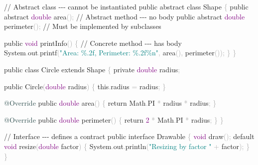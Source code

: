 \documentclass[
  justified,
  openright,
]{tufte-book}
\newcommand{\AttributeTok}[1]{\textcolor{DarkSlateGray}{#1}}
\newcommand{\BuiltInTok}[1]{#1}
\newcommand{\CommentTok}[1]{\textcolor{MidGray}{#1}}
\newcommand{\ControlFlowTok}[1]{\textcolor{BrandBlue}{#1}}
\newcommand{\DataTypeTok}[1]{\textcolor{Purple}{#1}}
\newcommand{\DecValTok}[1]{\textcolor{Purple}{#1}}
\newcommand{\FunctionTok}[1]{\textcolor{BrandBlue}{#1}}
\newcommand{\KeywordTok}[1]{\textcolor{BrandBlue}{#1}}
\newcommand{\NormalTok}[1]{#1}
\newcommand{\OperatorTok}[1]{\textcolor{DarkGray}{#1}}
\newcommand{\SpecialCharTok}[1]{\textcolor{Teal}{#1}}
\newcommand{\StringTok}[1]{\textcolor{Teal}{#1}}
\newenvironment{Shaded}{%
  \begin{snugshade}
}{%
  \end{snugshade}
}
\begin{document}
\begin{Shaded}
\begin{Highlighting}[]
\CommentTok{// Abstract class {-}{-}{-} cannot be instantiated}
\KeywordTok{public} \KeywordTok{abstract} \KeywordTok{class} \BuiltInTok{Shape} \OperatorTok{\{}
    \KeywordTok{public} \KeywordTok{abstract} \DataTypeTok{double} \FunctionTok{area}\OperatorTok{();}      \CommentTok{// Abstract method {-}{-}{-} no body}
    \KeywordTok{public} \KeywordTok{abstract} \DataTypeTok{double} \FunctionTok{perimeter}\OperatorTok{();} \CommentTok{// Must be implemented by subclasses}

    \KeywordTok{public} \DataTypeTok{void} \FunctionTok{printInfo}\OperatorTok{()} \OperatorTok{\{}           \CommentTok{// Concrete method {-}{-}{-} has body}
        \BuiltInTok{System}\OperatorTok{.}\FunctionTok{out}\OperatorTok{.}\FunctionTok{printf}\OperatorTok{(}\StringTok{"Area: }\SpecialCharTok{\%.2f}\StringTok{, Perimeter: }\SpecialCharTok{\%.2f\%n}\StringTok{"}\OperatorTok{,} \FunctionTok{area}\OperatorTok{(),} \FunctionTok{perimeter}\OperatorTok{());}
    \OperatorTok{\}}
\OperatorTok{\}}

\KeywordTok{public} \KeywordTok{class}\NormalTok{ Circle }\KeywordTok{extends} \BuiltInTok{Shape} \OperatorTok{\{}
    \KeywordTok{private} \DataTypeTok{double}\NormalTok{ radius}\OperatorTok{;}

    \KeywordTok{public} \FunctionTok{Circle}\OperatorTok{(}\DataTypeTok{double}\NormalTok{ radius}\OperatorTok{)} \OperatorTok{\{} \KeywordTok{this}\OperatorTok{.}\FunctionTok{radius} \OperatorTok{=}\NormalTok{ radius}\OperatorTok{;} \OperatorTok{\}}

    \AttributeTok{@Override}
    \KeywordTok{public} \DataTypeTok{double} \FunctionTok{area}\OperatorTok{()} \OperatorTok{\{} \ControlFlowTok{return} \BuiltInTok{Math}\OperatorTok{.}\FunctionTok{PI} \OperatorTok{*}\NormalTok{ radius }\OperatorTok{*}\NormalTok{ radius}\OperatorTok{;} \OperatorTok{\}}

    \AttributeTok{@Override}
    \KeywordTok{public} \DataTypeTok{double} \FunctionTok{perimeter}\OperatorTok{()} \OperatorTok{\{} \ControlFlowTok{return} \DecValTok{2} \OperatorTok{*} \BuiltInTok{Math}\OperatorTok{.}\FunctionTok{PI} \OperatorTok{*}\NormalTok{ radius}\OperatorTok{;} \OperatorTok{\}}
\OperatorTok{\}}

\CommentTok{// Interface {-}{-}{-} defines a contract}
\KeywordTok{public} \KeywordTok{interface}\NormalTok{ Drawable }\OperatorTok{\{}
    \DataTypeTok{void} \FunctionTok{draw}\OperatorTok{();}
    \KeywordTok{default} \DataTypeTok{void} \FunctionTok{resize}\OperatorTok{(}\DataTypeTok{double}\NormalTok{ factor}\OperatorTok{)} \OperatorTok{\{}
        \BuiltInTok{System}\OperatorTok{.}\FunctionTok{out}\OperatorTok{.}\FunctionTok{println}\OperatorTok{(}\StringTok{"Resizing by factor "} \OperatorTok{+}\NormalTok{ factor}\OperatorTok{);}
    \OperatorTok{\}}
\OperatorTok{\}}
\end{Highlighting}
\end{Shaded}
\end{document}
